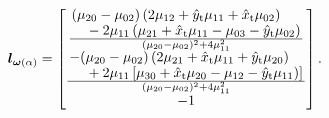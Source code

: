 \documentclass[lettersize,journal]{IEEEtran}
\begin{document}
\begin{align*}
    \boldsymbol{l}_{\boldsymbol{\omega}(\alpha)} 
    &= \begin{bmatrix} \frac{\splitfrac{(\mu_{20} - \mu_{02})\left( 2 \mu_{12} + \hat{y}_{\text{t}} \mu_{11} + \hat{x}_{\text{t}} \mu_{02} \right) }{ - 2 \mu_{11} \left( \mu_{21} + \hat{x}_{\text{t}} \mu_{11} - \mu_{03} - \hat{y}_{\text{t}} \mu_{02} \right)}}{(\mu_{20} - \mu_{02})^2 + 4 \mu_{11}^2} \\ \frac{\splitfrac{ - (\mu_{20} - \mu_{02})\left( 2 \mu_{21} + \hat{x}_{\text{t}} \mu_{11} + \hat{y}_{\text{t}} \mu_{20} \right) }{ + 2 \mu_{11} \left[ \mu_{30} + \hat{x}_{\text{t}} \mu_{20} - \mu_{12} - \hat{y}_{\text{t}} \mu_{11} ) \right]}}{(\mu_{20} - \mu_{02})^2 + 4 \mu_{11}^2} \\ -1 \end{bmatrix}.
\end{align*} 
\end{document}
